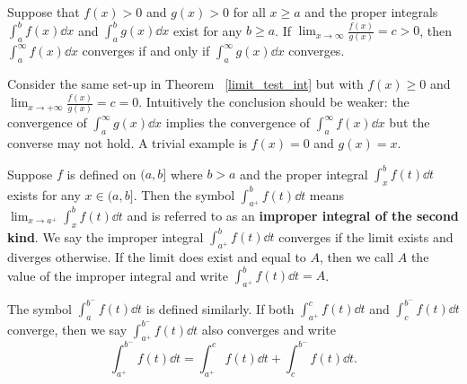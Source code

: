     \begin{theoremenv}\label{limit_test_int}
        Suppose that $f(x)>0$ and $g(x)>0$ for all $x\ge a$ and the proper integrals $\displaystyle \int_a^b f(x) \dd x$ and $\displaystyle \int_a^b g(x) \dd x$ exist for any $b\ge a$. If $\displaystyle \lim_{x\to \infty} \frac{f(x)}{g(x)} = c>0$, then $\displaystyle \int_a^\infty f(x) \dd x$ converges if and only if $\displaystyle \int_a^\infty g(x) \dd x$ converges.
    \end{theoremenv}
    \begin{remarkenv}
        Consider the same set-up in Theorem ~\ref{limit_test_int} but with $f(x)\ge 0$ and $\displaystyle \lim_{x\to +\infty} \frac{f(x)}{g(x)} = c = 0$. Intuitively the conclusion should be weaker: the convergence of $\displaystyle \int_a^\infty g(x) \dd x$ implies the convergence of $\displaystyle \int_a^\infty f(x) \dd x$ but the converse may not hold. A trivial example is $f(x)=0$ and $g(x)=x$.
    \end{remarkenv}
    \begin{definitionenv}
        Suppose $f$ is defined on $(a,b]$ where $b>a$ and the proper integral $\displaystyle \int_x^b f(t) \dd t$ exists for any $x\in (a,b]$. Then the symbol $\displaystyle \int_{a^+}^b f(t) \dd t$ means $\displaystyle \lim_{x\to a^+} \int_x^b f(t) \dd t$ and is referred to as an \textbf{improper integral of the second kind}. We say the improper integral $\displaystyle \int_{a^+}^b f(t) \dd t$ converges if the limit exists and diverges otherwise. If the limit does exist and equal to $A$, then we call $A$ the value of the improper integral and write $\displaystyle \int_{a^+}^b f(t) \dd t = A$.
    \end{definitionenv}
    \begin{definitionenv}
        The symbol $\displaystyle \int_{a}^{b^-} f(t) \dd t$ is defined similarly. If both $\displaystyle \int_{a^+}^c f(t) \dd t$ and $\displaystyle \int_c^{b^-} f(t) \dd t$ converge, then we say $\displaystyle \int_{a^+}^{b^-} f(t) \dd t$ also converges and write
        \[
        \int_{a^+}^{b^-} f(t) \dd t = \int_{a^+}^c f(t) \dd t + \int_c^{b^-} f(t) \dd t.
        \]
    \end{definitionenv}
    
